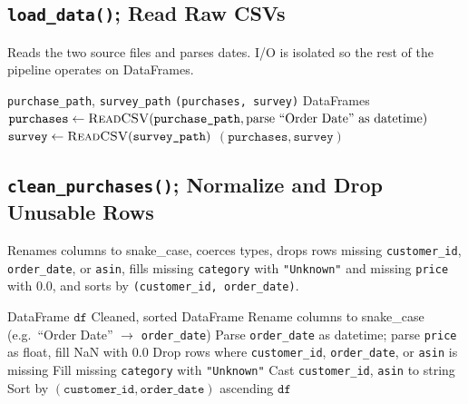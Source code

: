 \documentclass[11pt,a4paper]{article}
\begin{document}
\subsection{\texttt{load\_data()}; Read Raw CSVs}

Reads the two source files and parses dates.  I/O is isolated so the rest of the pipeline operates on DataFrames.

\begin{algorithm}[H]
\caption{\textsc{LoadData}}\label{alg:load-data}
\begin{algorithmic}[1]
\Require \texttt{purchase\_path}, \texttt{survey\_path}
\Ensure \texttt{(purchases, survey)} DataFrames
\State $\texttt{purchases} \gets \Call{ReadCSV}{\texttt{purchase\_path}, \text{parse ``Order Date'' as datetime}}$
\State $\texttt{survey} \gets \Call{ReadCSV}{\texttt{survey\_path}}$
\State \Return $(\texttt{purchases}, \texttt{survey})$
\end{algorithmic}
\end{algorithm}


\subsection{\texttt{clean\_purchases()}; Normalize and Drop Unusable Rows}

Renames columns to snake\_case, coerces types, drops rows missing \texttt{customer\_id}, \texttt{order\_date}, or \texttt{asin}, fills missing \texttt{category} with \texttt{"Unknown"} and missing \texttt{price} with $0.0$, and sorts by \texttt{(customer\_id, order\_date)}.

\begin{algorithm}[H]
\caption{\textsc{CleanPurchases}}\label{alg:clean-purchases}
\begin{algorithmic}[1]
\Require DataFrame $\texttt{df}$
\Ensure Cleaned, sorted DataFrame
\State Rename columns to snake\_case (e.g.\ ``Order Date'' $\to$ \texttt{order\_date})
\State Parse \texttt{order\_date} as datetime; parse \texttt{price} as float, fill NaN with $0.0$
\State Drop rows where \texttt{customer\_id}, \texttt{order\_date}, or \texttt{asin} is missing
\State Fill missing \texttt{category} with \texttt{"Unknown"}
\State Cast \texttt{customer\_id}, \texttt{asin} to string
\State Sort by $(\texttt{customer\_id}, \texttt{order\_date})$ ascending
\State \Return $\texttt{df}$
\end{algorithmic}
\end{algorithm}
\end{document}
